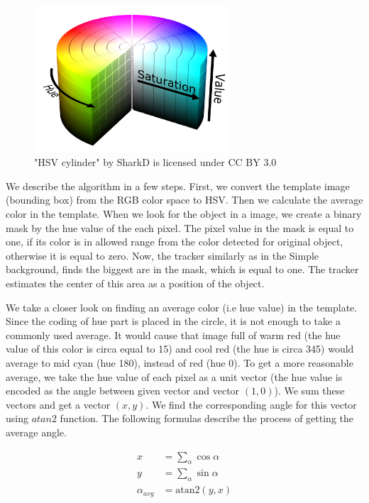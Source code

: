 \begin{figure}[h!]\centering
\includegraphics[width=0.65\textwidth]{img/hsv-cylinder.png}
\caption[Blah]{"HSV cylinder" by SharkD is licensed under CC BY 3.0 \footnotemark}
\end{figure}

We describe the algorithm in a few steps. First, we convert the template image
(bounding box) from the RGB color space to HSV. Then we calculate the average
color in the template. When we look for the object in a image, we create a
binary mask by the hue value of the each pixel. The pixel value in the mask is
equal to one, if its color is in allowed range from the color detected for
original object, otherwise it is equal to zero. Now, the tracker similarly as
in the Simple background, finds the biggest are in the mask, which is equal to
one. The tracker estimates the center of this area as a position of the object.

We take a closer look on finding an average color (i.e hue value) in the
template.  Since the coding of hue part is placed in the circle, it is not
enough to take a commonly used average. It would cause that image full of warm
red (the hue value of this color is circa equal to 15) and cool red (the hue is
circa 345) would average to mid cyan (hue 180), instead of red (hue 0). To get
a more reasonable average, we take the hue value of each pixel as a unit vector
(the hue value is encoded as the angle between given vector and vector $(1,
0)$). We sum these vectors and get a vector $(x, y)$. We find the corresponding
angle for this vector using $atan2$ function. The following formulas describe
the process of getting the average angle.

$$
\begin{aligned}
x &= \sum_\alpha \cos \alpha \\
y &= \sum_\alpha \sin \alpha \\
\alpha_{avg} &= \text{atan2}(y, x)
\end{aligned}
$$


